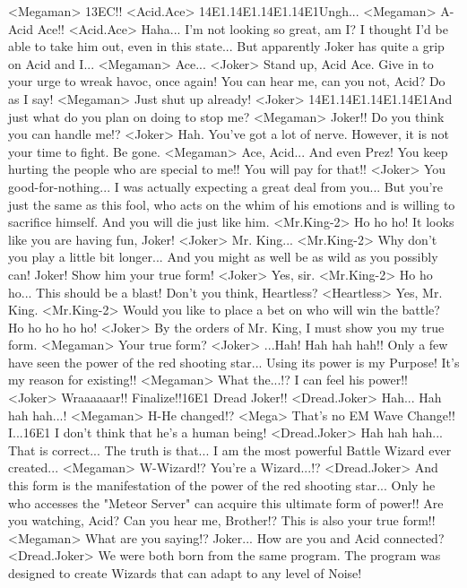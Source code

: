 <Megaman> {13}{EC}!! 
<Acid.Ace> {14}{E1}.{14}{E1}.{14}{E1}.{14}{E1}Ungh... 
<Megaman> A-Acid Ace!! 
<Acid.Ace> Haha... I'm not looking so great, am I? 
I thought I'd be able to take him out, even in this state... 
But apparently Joker has quite a grip on Acid and I... 
<Megaman> Ace... 
<Joker> Stand up, Acid Ace. 
Give in to your urge to wreak havoc, once again! 
You can hear me, can you not, Acid? 
Do as I say! 
<Megaman> Just shut up already! 
<Joker> {14}{E1}.{14}{E1}.{14}{E1}.{14}{E1}And just what do you plan on doing to stop me? 
<Megaman> Joker!! 
Do you think you can handle me!? 
<Joker> Hah. 
You've got a lot of nerve. 
However, it is not your time to fight. 
Be gone. 
<Megaman> Ace, Acid... 
And even Prez! 
You keep hurting the people who are special to me!! 
You will pay for that!! 
<Joker> You good-for-nothing... 
I was actually expecting a great deal from you... 
But you're just the same as this fool, who acts on the 
whim of his emotions and is willing to sacrifice himself. 
And you will die just like him. 
<Mr.King-2> Ho ho ho! 
It looks like you are having fun, Joker! 
<Joker> Mr. King... 
<Mr.King-2> Why don't you play a little bit longer... 
And you might as well be as wild as you possibly can! 
Joker! 
Show him your true form! 
<Joker> Yes, sir. 
<Mr.King-2> Ho ho ho... This should be a blast! 
Don't you think, Heartless? 
<Heartless> Yes, Mr. King. 
<Mr.King-2> Would you like to place a bet on who will win the battle? 
Ho ho ho ho ho! 
<Joker> By the orders of Mr. King, I must show you my true form. 
<Megaman> Your true form? 
<Joker> ...Hah! 
Hah hah hah!! 
Only a few have seen the power of the red shooting star... 
Using its power is my Purpose! 
It's my reason for existing!! 
<Megaman> What the...!? I can feel his power!! 
<Joker> Wraaaaaar!! 
Finalize!!{16}{E1} Dread Joker!! 
<Dread.Joker> Hah... Hah hah hah...! 
<Megaman> H-He changed!? 
<Mega> That's no EM Wave Change!! 
I...{16}{E1} I don't think that he's a human being! 
<Dread.Joker> Hah hah hah... That is correct... 
The truth is that... 
I am the most powerful Battle Wizard ever created... 
<Megaman> W-Wizard!? 
You're a Wizard...!? 
<Dread.Joker> And this form is the manifestation of the power of the red shooting star... 
Only he who accesses the "Meteor Server" can acquire this ultimate form of power!! 
Are you watching, Acid? Can you hear me, Brother!? 
This is also your true form!! 
<Megaman> What are you saying!? 
Joker... How are you and Acid connected? 
<Dread.Joker> We were both born from the same program. 
The program was designed to create Wizards that can adapt to any level of Noise! 
